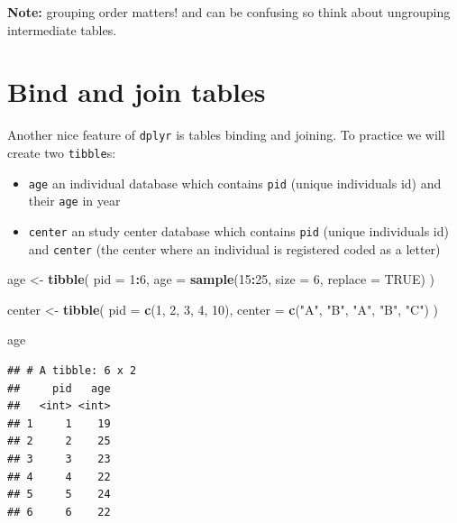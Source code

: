 \documentclass[
]{book}
\newenvironment{Shaded}{\begin{snugshade}}{\end{snugshade}}
\newcommand{\AttributeTok}[1]{\textcolor[rgb]{0.13,0.29,0.53}{#1}}
\newcommand{\ConstantTok}[1]{\textcolor[rgb]{0.56,0.35,0.01}{#1}}
\newcommand{\DecValTok}[1]{\textcolor[rgb]{0.00,0.00,0.81}{#1}}
\newcommand{\FunctionTok}[1]{\textcolor[rgb]{0.13,0.29,0.53}{\textbf{#1}}}
\newcommand{\NormalTok}[1]{#1}
\newcommand{\OtherTok}[1]{\textcolor[rgb]{0.56,0.35,0.01}{#1}}
\newcommand{\SpecialCharTok}[1]{\textcolor[rgb]{0.81,0.36,0.00}{\textbf{#1}}}
\newcommand{\StringTok}[1]{\textcolor[rgb]{0.31,0.60,0.02}{#1}}
\providecommand{\tightlist}{%
  \setlength{\itemsep}{0pt}\setlength{\parskip}{0pt}}
\begin{document}
\textbf{Note:} grouping order matters! and can be confusing so think about ungrouping intermediate tables.

\section{Bind and join tables}\label{bind-and-join-tables}

Another nice feature of \texttt{dplyr} is tables binding and joining. To practice we will create two \texttt{tibble}s:

\begin{itemize}
\tightlist
\item
  \texttt{age} an individual database which contains \texttt{pid} (unique individuals id)
  and their \texttt{age} in year
\item
  \texttt{center} an study center database which contains \texttt{pid} (unique individuals id)
  and \texttt{center} (the center where an individual is registered coded as a letter)
\end{itemize}

\begin{Shaded}
\begin{Highlighting}[]
\NormalTok{age }\OtherTok{\textless{}{-}}
  \FunctionTok{tibble}\NormalTok{(}
    \AttributeTok{pid =} \DecValTok{1}\SpecialCharTok{:}\DecValTok{6}\NormalTok{,}
    \AttributeTok{age =} \FunctionTok{sample}\NormalTok{(}\DecValTok{15}\SpecialCharTok{:}\DecValTok{25}\NormalTok{, }\AttributeTok{size =} \DecValTok{6}\NormalTok{, }\AttributeTok{replace =} \ConstantTok{TRUE}\NormalTok{)}
\NormalTok{  )}

\NormalTok{center }\OtherTok{\textless{}{-}}
  \FunctionTok{tibble}\NormalTok{(}
    \AttributeTok{pid =} \FunctionTok{c}\NormalTok{(}\DecValTok{1}\NormalTok{, }\DecValTok{2}\NormalTok{, }\DecValTok{3}\NormalTok{, }\DecValTok{4}\NormalTok{, }\DecValTok{10}\NormalTok{),}
    \AttributeTok{center =} \FunctionTok{c}\NormalTok{(}\StringTok{"A"}\NormalTok{, }\StringTok{"B"}\NormalTok{, }\StringTok{"A"}\NormalTok{, }\StringTok{"B"}\NormalTok{, }\StringTok{"C"}\NormalTok{)}
\NormalTok{  )}

\NormalTok{age}
\end{Highlighting}
\end{Shaded}

\begin{verbatim}
## # A tibble: 6 x 2
##     pid   age
##   <int> <int>
## 1     1    19
## 2     2    25
## 3     3    23
## 4     4    22
## 5     5    24
## 6     6    22
\end{verbatim}
\end{document}
